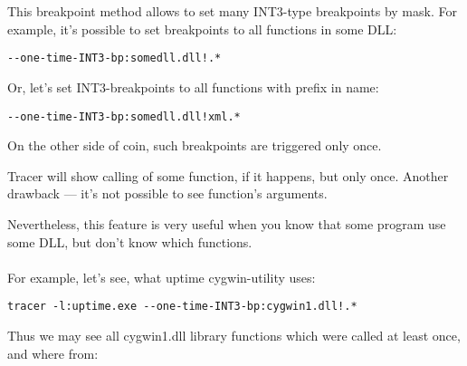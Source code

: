 ﻿\chapter{}

{This breakpoint method allows to set many INT3-type breakpoints by mask.}
{For example, it's possible to set breakpoints to all functions in some DLL:}

\begin{lstlisting}
--one-time-INT3-bp:somedll.dll!.*
\end{lstlisting}

{Or, let's set INT3-breakpoints to all functions with  prefix in name:}

\begin{lstlisting}
--one-time-INT3-bp:somedll.dll!xml.*
\end{lstlisting}

{On the other side of coin, such breakpoints are triggered only once.}

Tracer 
{will show calling of some function, if it happens, but only once.}
{Another drawback --- it's not possible to see function's arguments.}

{Nevertheless, this feature is very useful when you know that some program use some DLL, but don't know which functions.}
 \\
\\
{For example, let's see, what uptime cygwin-utility uses}:

\begin{lstlisting}
tracer -l:uptime.exe --one-time-INT3-bp:cygwin1.dll!.*
\end{lstlisting}

{Thus we may see all cygwin1.dll library functions which were called at least once, and where from}:


